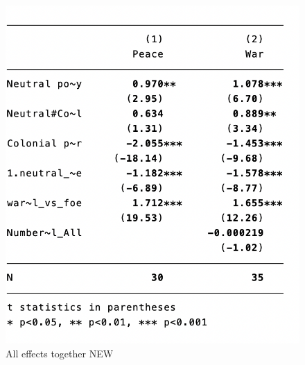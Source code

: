 \documentclass[12pt,a4paper,notitlepage,english]{article}
\begin{document}
\begin{figure}
	\centering
	\caption{All effects together NEW}
	\label{effects_together}
	\includegraphics[scale=.8]{reg_4_all_together_new.png}
\end{figure}
\end{document}
